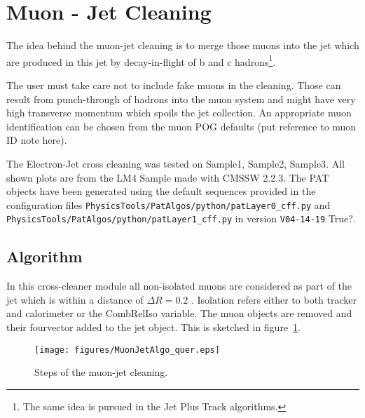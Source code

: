 \documentclass{cmspaper}
\begin{document}

\newpage
\section{Muon - Jet Cleaning}
The idea behind the muon-jet cleaning is to merge those muons into the jet which
are produced in this jet by decay-in-flight of b and c hadrons\footnote{The same
idea is pursued in the Jet Plus Track algorithms.}.

The user must take care not to include fake muons in the cleaning. Those can
result from punch-through of hadrons into the muon system and might have very
high transverse momentum which spoils the jet collection. An appropriate muon
identification can be chosen from the muon POG defaults {\color{red}(put reference to muon
ID note here)}.

The Electron-Jet cross cleaning was tested on {\color{red}Sample1, Sample2, Sample3}. All shown plots are from the LM4 Sample made with CMSSW 2.2.3. The PAT objects have been
generated using the default sequences provided in the configuration files
\texttt{PhysicsTools/PatAlgos/python/patLayer0\_cff.py} and
\texttt{PhysicsTools/PatAlgos/python/patLayer1\_cff.py} in version
{\color{red}\texttt{V04-14-19} True?}.
\\


\subsection{Algorithm}
In this cross-cleaner module all non-isolated muons are considered as part of the jet which
is within a distance of $\Delta R=0.2$ . Isolation
refers either to both tracker and calorimeter or the CombRelIso variable. The
muon objects are removed and their fourvector added to the jet object. 
This is sketched in figure~\ref{fig:MJCleaning}.

\begin{figure}[hbt]
\begin{center}
\texttt{[image: figures/MuonJetAlgo\_quer.eps]}
\caption{Steps of the muon-jet cleaning.}
\label{fig:MJCleaning}
\end{center}
\end{figure}
\end{document}
